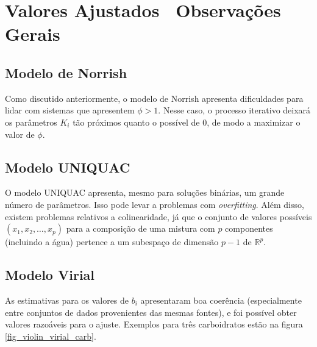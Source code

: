 \documentclass[
	12pt,				%
	openright,
	twoside,
	a4paper,			%
	english,			%
	french,				%
	spanish,			%
	brazil				%
	]{abntex2}
\begin{document}
\section{Valores Ajustados \textendash\ Observações Gerais}

\subsection{Modelo de Norrish}

Como discutido anteriormente, o modelo de Norrish apresenta dificuldades para
lidar com sistemas que apresentem $\phi > 1$. Nesse caso, o processo iterativo
deixará os parâmetros $K_i$ tão próximos quanto o possível de 0, de modo a
maximizar o valor de $\phi$.

\subsection{Modelo UNIQUAC}

O modelo UNIQUAC apresenta, mesmo para soluções binárias, um grande número
de parâmetros. Isso pode levar a problemas com \textit{overfitting}. Além disso,
existem problemas relativos a colinearidade, já que o conjunto de valores
possíveis $(x_1,x_2,\ldots,x_p)$ para a composição de uma mistura com $p$
componentes (incluindo a água) pertence a um subespaço de dimensão $p-1$
de $\mathbb{R}^p$.

\subsection{Modelo Virial}

As estimativas para os valores de $b_i$ apresentaram boa coerência (especialmente
entre conjuntos de dados provenientes das mesmas fontes), e foi possível obter
valores razoáveis para o ajuste. Exemplos para três carboidratos estão na figura
\ref{fig_violin_virial_carb}.
\end{document}
